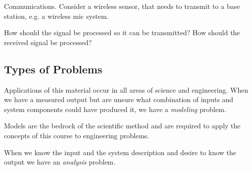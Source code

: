 \begin{example} Communications. Consider a wireless sensor, that needs to transmit to a base station, e.g. a wireless mic system. 
  \begin{center}
  \end{center}

  How should the signal be processed so it can be transmitted? How should the received signal be processed?
\end{example}

\subsection*{Types of Problems}
Applications of this material occur in all areas of science and engineering. When we have a measured output but are unsure what combination of inputs and system components could have produced it, we have a {\it modeling} problem.

\begin{center}
\end{center}

Models are the bedrock of the scientific method and are required to apply the concepts of this course to engineering problems. 

When we know the input and the system description and desire to know the output we have an {\it analysis} problem. 

